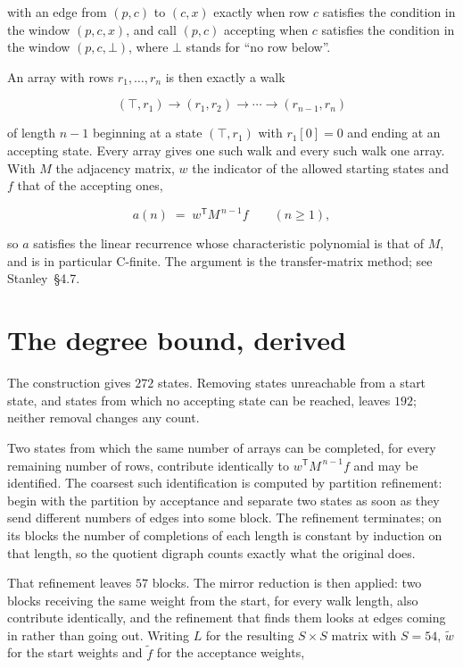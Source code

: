 \documentclass[11pt]{article}
\theoremstyle{definition}
\begin{document}
with an edge from $(p,c)$ to $(c,x)$ exactly when row $c$ satisfies the condition in the window $(p,c,x)$, and call $(p,c)$ accepting when $c$ satisfies the condition in the window $(p,c,\bot)$, where $\bot$ stands for ``no row below''.

An array with rows $r_1,\dots,r_n$ is then exactly a walk

\[(\top,r_1) \to (r_1,r_2) \to \cdots \to (r_{n-1},r_n)\]

of length $n-1$ beginning at a state $(\top,r_1)$ with $r_1[0]=0$ and ending at an accepting state. Every array gives one such walk and every such walk one array. With $M$ the adjacency matrix, $w$ the indicator of the allowed starting states and $f$ that of the accepting ones,

\[a(n) \;=\; w^{\mathsf T} M^{\,n-1} f \qquad (n \ge 1),\]

so $a$ satisfies the linear recurrence whose characteristic polynomial is that of $M$, and is in particular C-finite. The argument is the transfer-matrix method; see Stanley~\S4.7.

\section{The degree bound, derived}

The construction gives $272$ states. Removing states unreachable from a start state, and states from which no accepting state can be reached, leaves $192$; neither removal changes any count.

Two states from which the same number of arrays can be completed, for every remaining number of rows, contribute identically to $w^{\mathsf T}M^{\,n-1}f$ and may be identified. The coarsest such identification is computed by partition refinement: begin with the partition by acceptance and separate two states as soon as they send different numbers of edges into some block. The refinement terminates; on its blocks the number of completions of each length is constant by induction on that length, so the quotient digraph counts exactly what the original does.

That refinement leaves $57$ blocks. The mirror reduction is then applied: two blocks receiving the same weight from the start, for every walk length, also contribute identically, and the refinement that finds them looks at edges coming in rather than going out. Writing $L$ for the resulting $S \times S$ matrix with $S = 54$, $\tilde w$ for the start weights and $\tilde f$ for the acceptance weights,
\end{document}

